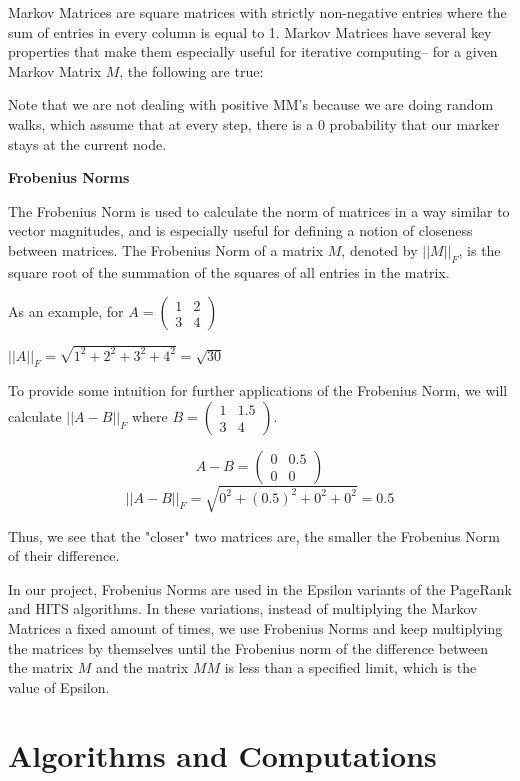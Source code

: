 \documentclass[12pt, titlepage, twoside]{amsart}
\theoremstyle{remark}
\begin{document}
Markov Matrices are square matrices with strictly non-negative entries where the sum of entries in every column is equal to 1. Markov Matrices have several key properties that make them especially useful for iterative computing-- for a given Markov Matrix $M$, the following are true:


Note that we are not dealing with positive MM's because we are doing random walks, which assume that at every step, there is a 0 probability that our marker stays at the current node.


\textbf{Frobenius Norms}

The Frobenius Norm is used to calculate the norm of matrices in a way similar to vector magnitudes, and is especially useful for defining a notion of closeness between matrices. The Frobenius Norm of a matrix $M$, denoted by $||M||_F$, is the square root of the summation of the squares of all entries in the matrix.

As an example, for $A=\begin{pmatrix}1&2\\3&4\end{pmatrix}$

$||A||_F = \sqrt{1^2 + 2^2+ 3^2+ 4^2} = \sqrt{30}$

To provide some intuition for further applications of the Frobenius Norm, we will calculate $||A-B||_F$ where $B=\begin{pmatrix}1&1.5\\3&4\end{pmatrix}$.

\[A-B = \begin{pmatrix}0&0.5\\0&0\end{pmatrix}\]
\[||A-B||_F = \sqrt{0^2+(0.5)^2+0^2+0^2} = 0.5\]

Thus, we see that the "closer" two matrices are, the smaller the Frobenius Norm of their difference.

In our project, Frobenius Norms are used in the Epsilon variants of the PageRank and HITS algorithms. In these variations, instead of multiplying the Markov Matrices a fixed amount of times, we use Frobenius Norms and keep multiplying the matrices by themselves until the Frobenius norm of the difference between the matrix $M$ and the matrix $MM$ is less than a specified limit, which is the value of Epsilon.


\section{Algorithms and Computations}
\end{document}
